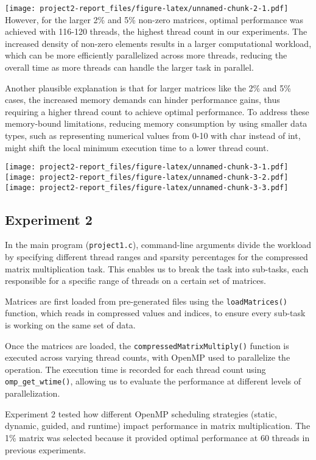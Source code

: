 \documentclass[
]{article}
\begin{document}
\texttt{[image: project2-report\_files/figure-latex/unnamed-chunk-2-1.pdf]}
However, for the larger 2\% and 5\% non-zero matrices, optimal
performance was achieved with 116-120 threads, the highest thread count
in our experiments. The increased density of non-zero elements results
in a larger computational workload, which can be more efficiently
parallelized across more threads, reducing the overall time as more
threads can handle the larger task in parallel.

Another plausible explanation is that for larger matrices like the 2\%
and 5\% cases, the increased memory demands can hinder performance
gains, thus requiring a higher thread count to achieve optimal
performance. To address these memory-bound limitations, reducing memory
consumption by using smaller data types, such as representing numerical
values from 0-10 with char instead of int, might shift the local minimum
execution time to a lower thread count.

\texttt{[image: project2-report\_files/figure-latex/unnamed-chunk-3-1.pdf]}
\texttt{[image: project2-report\_files/figure-latex/unnamed-chunk-3-2.pdf]}
\texttt{[image: project2-report\_files/figure-latex/unnamed-chunk-3-3.pdf]}

\subsection{Experiment 2}\label{experiment-2}

In the main program (\texttt{project1.c}), command-line arguments divide
the workload by specifying different thread ranges and sparsity
percentages for the compressed matrix multiplication task. This enables
us to break the task into sub-tasks, each responsible for a specific
range of threads on a certain set of matrices.

Matrices are first loaded from pre-generated files using the
\texttt{loadMatrices()} function, which reads in compressed values and
indices, to ensure every sub-task is working on the same set of data.

Once the matrices are loaded, the \texttt{compressedMatrixMultiply()}
function is executed across varying thread counts, with OpenMP used to
parallelize the operation. The execution time is recorded for each
thread count using \texttt{omp\_get\_wtime()}, allowing us to evaluate
the performance at different levels of parallelization.

Experiment 2 tested how different OpenMP scheduling strategies (static,
dynamic, guided, and runtime) impact performance in matrix
multiplication. The 1\% matrix was selected because it provided optimal
performance at 60 threads in previous experiments.
\end{document}
